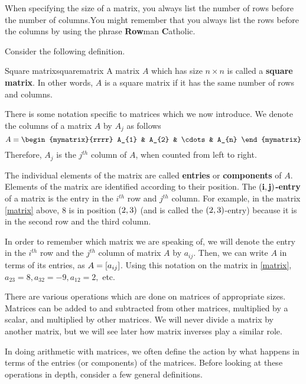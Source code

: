 When specifying the size of a matrix, you always list the number
of rows before the number of columns.You
might remember that you always list the rows before the columns by using the
phrase \textbf{Row}man \textbf{C}atholic. 

Consider the following definition.

\begin{definition}{Square matrix}{squarematrix}
A matrix $A$ which has size $n \times n$ is called a \textbf{square matrix}.
In other words, $A$ is a square matrix if it has the same number of rows
and columns.
\end{definition}

There is some notation specific to matrices which we now introduce. We denote the columns of a matrix $A$ 
by $A_{j}$ as follows
\begin{equation*}
A = 
\begin{mymatrix}{rrrr}
A_{1} & A_{2} & \cdots & A_{n}
\end{mymatrix}
\end{equation*}
Therefore, $A_{j}$ is the $j^{th}$ column of $A$, when counted from left to right. 

The individual elements of the matrix are called \textbf{entries} or \textbf{components} of $A$. Elements of the matrix
are identified according to their position. The $\mathbf{\left(i, j \right)}$\textbf{-entry} of a matrix is the entry 
in the $i^{th}$ row and $j^{th}$ column. For example, in the matrix \ref{matrix} above,  $8$ is in
position $\left(2,3 \right)$ (and is called the $\left(2,3 \right)$-entry) because it is in the second row and the third column. 

In order to remember which matrix we are speaking of, we 
will denote the entry in the $i^{th}$ row  and the $j^{th}$ column of matrix $A$ by $a_{ij}$. Then, we can write $A$ in terms of its entries,
as $A= \left[a_{ij} \right]$. Using this notation on the matrix in \ref{matrix},
$a_{23}=8, a_{32}=-9, a_{12}=2,$ etc.

There are various operations which are done on matrices of appropriate
sizes. Matrices can be added to and subtracted from other matrices,
multiplied by a scalar, and multiplied by other matrices. We will
never divide a matrix by another matrix, but we will see later how matrix inverses play a similar role. 

In doing arithmetic with matrices, we often define the action by what
happens in terms of the entries (or components) of the
matrices. Before looking at these operations in depth, consider a few
general definitions.

